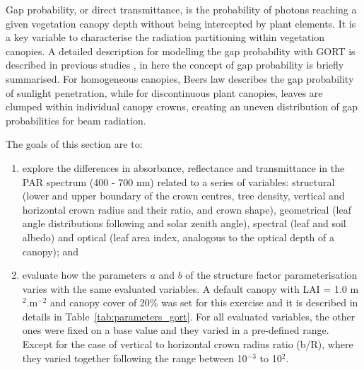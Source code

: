 Gap probability, or direct transmittance, is the probability of photons reaching a given vegetation canopy depth without being intercepted by plant elements. It is a key variable to characterise the radiation partitioning within vegetation canopies. A detailed description for modelling the gap probability with GORT is described in previous studies \citep{Li1995,Ni1999}, in here the concept of gap probability is briefly summarised. For  homogeneous  canopies,  Beer\textsc{}s  law  describes  the gap  probability  of  sunlight  penetration, while for discontinuous plant canopies, leaves are clumped within individual canopy crowns, creating an uneven distribution of gap probabilities for beam radiation.

The goals of this section are to: 
\begin{enumerate}
\item explore the differences in absorbance, reflectance and transmittance in the PAR spectrum (400 - 700 nm) related to a series of variables: structural (lower and upper boundary of the crown centres, tree density, vertical and horizontal crown radius and their ratio, and crown shape), geometrical (leaf angle distributions following \citet{deWit1965} and solar zenith angle), spectral (leaf and soil albedo) and optical (leaf area index, analogous to the optical depth of a canopy); and 

\item evaluate how the parameters $a$ and $b$ of the structure factor parameterisation \citep{pinty2006} varies with the same evaluated variables. 
A default canopy with LAI = 1.0 m$^2$.m$^{-2}$ and canopy cover of 20\% was set for this exercise and it is described in details in Table~\ref{tab:parameters_gort}. For all evaluated variables, the other ones were fixed on a base value and they varied in a pre-defined range. Except for the case of vertical to horizontal crown radius ratio (b/R), where they varied together following the range between 10$^{-3}$ to 10$^2$.
\end{enumerate}
